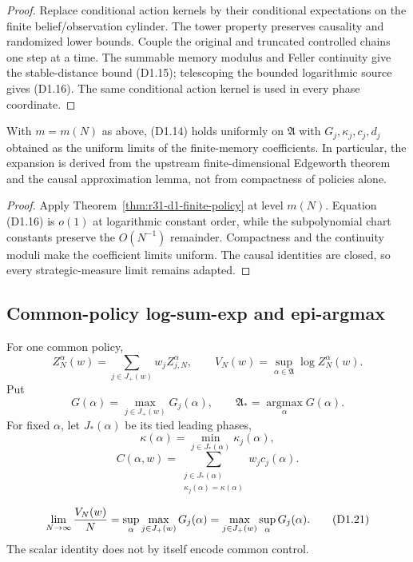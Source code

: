 \begin{proof}
Replace conditional action kernels by their conditional expectations on the
finite belief/observation cylinder.  The tower property preserves causality
and randomized lower bounds.  Couple the original and truncated controlled
chains one step at a time.  The summable memory modulus and Feller continuity
give the stable-distance bound (D1.15); telescoping the bounded logarithmic
source gives (D1.16).  The same conditional action kernel is used in every
phase coordinate.
\end{proof}

\begin{theorem}
\label{thm:r31-d1-uniform}
With $m=m(N)$ as above, (D1.14) holds uniformly on
$\mathfrak A$ with $G_j,\kappa_j,c_j,d_j$ obtained as the uniform limits of
the finite-memory coefficients.  In particular, the expansion is derived
from the upstream finite-dimensional Edgeworth theorem and the causal
approximation lemma, not from compactness of policies alone.
\end{theorem}

\begin{proof}
Apply Theorem~\ref{thm:r31-d1-finite-policy} at level $m(N)$.  Equation
(D1.16) is $o(1)$ at logarithmic constant order, while the subpolynomial chart
constants preserve the $O(N^{-1})$ remainder.  Compactness and the continuity
moduli make the coefficient limits uniform.  The causal identities are closed,
so every strategic-measure limit remains adapted.
\end{proof}

\subsection{Common-policy log-sum-exp and epi-argmax}

For one common policy,
\[
 Z_N^\alpha(w)=\sum_{j\in J_+(w)}w_jZ_{j,N}^\alpha,\qquad
 V_N(w)=\sup_{\alpha\in\mathfrak A}\log Z_N^\alpha(w).    \tag{D1.17}
\]
Put
\[
 G(\alpha)=\max_{j\in J_+(w)}G_j(\alpha),\qquad
 \mathfrak A_*=\operatorname*{argmax}_{\alpha}G(\alpha). \tag{D1.18}
\]
For fixed $\alpha$, let $J_*(\alpha)$ be its tied leading phases,
\[
 \kappa(\alpha)=\min_{j\in J_*(\alpha)}\kappa_j(\alpha),                \tag{D1.19}
\]
\[
 C(\alpha,w)=
 \sum_{\substack{j\in J_*(\alpha)\\
       \kappa_j(\alpha)=\kappa(\alpha)}}w_jc_j(\alpha).  \tag{D1.20}
\]

\begin{proposition}
\label{prop:r31-d1-leading}
\[
 \lim_{N\to\infty}{V_N(w)\over N}
 =\sup_\alpha\max_{j\in J_+(w)}G_j(\alpha)
 =\max_{j\in J_+(w)}\sup_\alpha G_j(\alpha).              \tag{D1.21}
\]
The scalar identity does not by itself encode common control.
\end{proposition}

